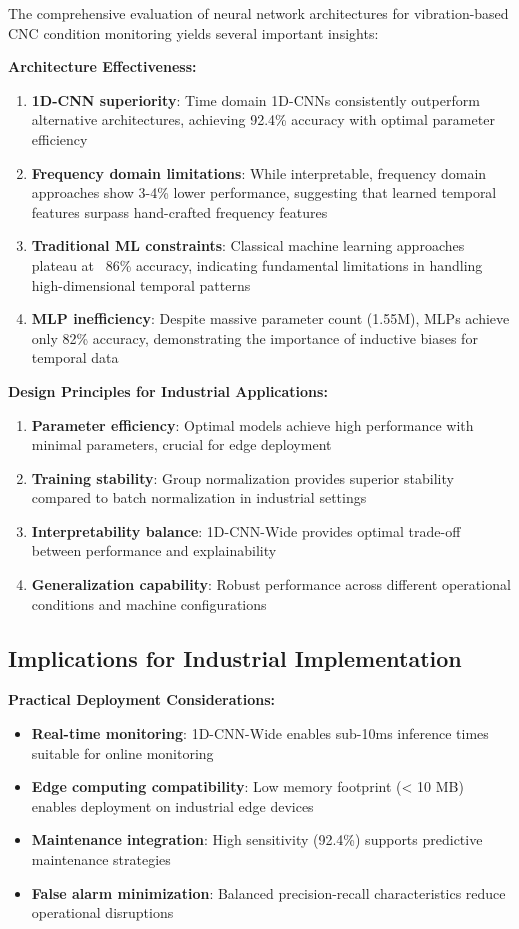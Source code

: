 \documentclass[12pt]{article}
\begin{document}
The comprehensive evaluation of neural network architectures for vibration-based CNC condition monitoring yields several important insights:

\textbf{Architecture Effectiveness:}
\begin{enumerate}
    \item \textbf{1D-CNN superiority}: Time domain 1D-CNNs consistently outperform alternative architectures, achieving 92.4\% accuracy with optimal parameter efficiency
    \item \textbf{Frequency domain limitations}: While interpretable, frequency domain approaches show 3-4\% lower performance, suggesting that learned temporal features surpass hand-crafted frequency features
    \item \textbf{Traditional ML constraints}: Classical machine learning approaches plateau at ~86\% accuracy, indicating fundamental limitations in handling high-dimensional temporal patterns
    \item \textbf{MLP inefficiency}: Despite massive parameter count (1.55M), MLPs achieve only 82\% accuracy, demonstrating the importance of inductive biases for temporal data
\end{enumerate}

\textbf{Design Principles for Industrial Applications:}
\begin{enumerate}
    \item \textbf{Parameter efficiency}: Optimal models achieve high performance with minimal parameters, crucial for edge deployment
    \item \textbf{Training stability}: Group normalization provides superior stability compared to batch normalization in industrial settings
    \item \textbf{Interpretability balance}: 1D-CNN-Wide provides optimal trade-off between performance and explainability
    \item \textbf{Generalization capability}: Robust performance across different operational conditions and machine configurations
\end{enumerate}

\subsection{Implications for Industrial Implementation}

\textbf{Practical Deployment Considerations:}
\begin{itemize}
    \item \textbf{Real-time monitoring}: 1D-CNN-Wide enables sub-10ms inference times suitable for online monitoring
    \item \textbf{Edge computing compatibility}: Low memory footprint (< 10 MB) enables deployment on industrial edge devices
    \item \textbf{Maintenance integration}: High sensitivity (92.4\%) supports predictive maintenance strategies
    \item \textbf{False alarm minimization}: Balanced precision-recall characteristics reduce operational disruptions
\end{itemize}
\end{document}
